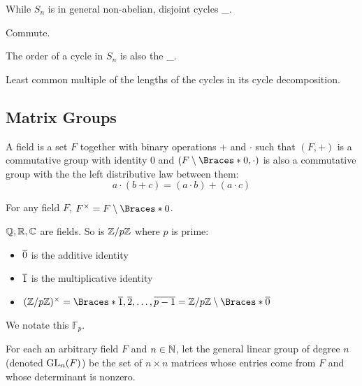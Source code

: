 \documentclass[a5paper]{article}
\begin{document}
\begin{note}
  \begin{field}
    While $S_n$ is in general non-abelian, disjoint cycles \_.
  \end{field}

  \begin{field}
    Commute.
  \end{field}
\end{note}

\begin{note}
  \begin{field}
    The order of a cycle in $S_n$ is also the \_.
  \end{field}

  \begin{field}
    Least common multiple of the lengths of the cycles in its cycle decomposition.
  \end{field}
\end{note}

\subsection{Matrix Groups}
\begin{definition}
	A field is a set $F$ together with binary operations $+$ and $\cdot$ such that
  $(F,+)$ is a commutative group with identity 0 and
  $(F\setminus\braces{0},\cdot)$ is also a commutative group with the the left
  distributive law between them:
  \begin{equation*}
    a\cdot(b+c)=(a\cdot b)+(a\cdot c)
  \end{equation*}

  For any field $F$, $F^\times=F\setminus\braces{0}$.
\end{definition}

\begin{example}
	$\mathbb{Q},\mathbb{R},\mathbb{C}$ are fields. So is $\mathbb{Z}/p\mathbb{Z}$ where $p$ is prime:
  \begin{itemize}
    \item $\overline{0}$ is the additive identity
    \item $\overline{1}$ is the multiplicative identity
    \item $(\Z/p\Z)^\times=\braces{\ov{1},\ov{2},\ldots,\ov{p-1}}=\Z/p\Z\setminus\braces{\ov{0}}$
  \end{itemize}
  We notate this $\mathbb{F}_p$.
\end{example}

\begin{definition}[$\GL_n(F)$]
	For each an arbitrary field $F$ and $n\in\mathbb{N}$, let the general linear group of
  degree $n$ (denoted $\GL_n(F)$) be the set of $n\times n$ matrices whose entries
  come from $F$ and whose determinant is nonzero.
\end{definition}
\end{document}
